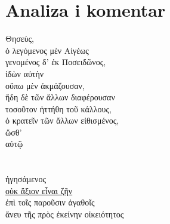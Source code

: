 \section*{Analiza i komentar}


{\large
\begin{greek}
\noindent Θησεὺς, \\
\tabto{2em} ὁ λεγόμενος μὲν Αἰγέως \\
\tabto{2em} γενομένος δ' ἐκ Ποσειδῶνος, \\
ἰδὼν αὐτὴν \\
\tabto{2em} οὔπω μὲν ἀκμάζουσαν, \\
\tabto{2em} ἤδη δὲ τῶν ἄλλων διαφέρουσαν\\
τοσοῦτον ἡττήθη τοῦ κάλλους, \\
ὁ κρατεῖν τῶν ἄλλων εἰθισμένος, \\
\tabto{2em} ὥσθ' \\
\tabto{4em}  αὐτῷ \\
\tabto{6em}  \\
\tabto{6em}  \\
\tabto{2em} ἡγησάμενος \\
\tabto{4em} \underline{οὐκ ἄξιον εἶναι ζῆν} \\
\tabto{6em} ἐπὶ τοῖς παροῦσιν ἀγαθοῖς \\
\tabto{6em} ἄνευ τῆς πρὸς ἐκείνην οἰκειότητος\\

\end{greek}
}

